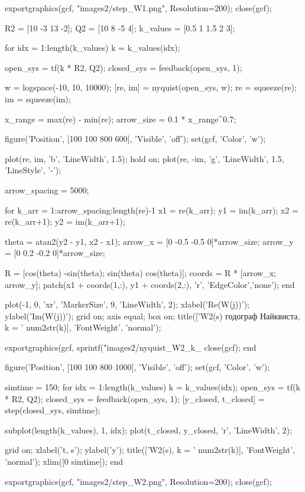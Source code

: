\begin{matlabcode}
exportgraphics(gcf, "images2/step_W1.png", Resolution=200);
close(gcf);

R2 = [10 -3 13 -2];
Q2 = [10 8 -5 4];
k_values = [0.5 1 1.5 2 3];

for idx = 1:length(k_values)
    k = k_values(idx);
    
    open_sys = tf(k * R2, Q2);
    closed_sys = feedback(open_sys, 1);
    
    w = logspace(-10, 10, 10000);
    [re, im] = nyquist(open_sys, w);
    re = squeeze(re);
    im = squeeze(im);
    
    x_range = max(re) - min(re);
    arrow_size = 0.1 * x_range^0.7;
    
    figure('Position', [100 100 800 600], 'Visible', 'off');
    set(gcf, 'Color', 'w');
    
    plot(re, im, 'b', 'LineWidth', 1.5);
    hold on;
    plot(re, -im, 'g', 'LineWidth', 1.5, 'LineStyle', '-');
    
    arrow_spacing = 5000;
    
    for k_arr = 1:arrow_spacing:length(re)-1
        x1 = re(k_arr);
        y1 = im(k_arr);
        x2 = re(k_arr+1);
        y2 = im(k_arr+1);
        
        theta = atan2(y2 - y1, x2 - x1);
        arrow_x = [0 -0.5 -0.5 0]*arrow_size;
        arrow_y = [0 0.2 -0.2 0]*arrow_size;
        
        R = [cos(theta) -sin(theta); sin(theta) cos(theta)];
        coords = R * [arrow_x; arrow_y];
        patch(x1 + coords(1,:), y1 + coords(2,:), 'r', 'EdgeColor','none');
    end
    
    plot(-1, 0, 'xr', 'MarkerSize', 9, 'LineWidth', 2);
    xlabel('Re(W(j\omega))');
    ylabel('Im(W(j\omega))');
    grid on;
    axis equal;
    box on;
    title(['W2(s) годограф Найквиста, k = ' num2str(k)], 'FontWeight', 'normal');
    
    exportgraphics(gcf, sprintf("images2/nyquist_W2_k_%
    close(gcf);
end

figure('Position', [100 100 800 1000], 'Visible', 'off');
set(gcf, 'Color', 'w');

simtime = 150;
for idx = 1:length(k_values)
    k = k_values(idx);
    open_sys = tf(k * R2, Q2);
    closed_sys = feedback(open_sys, 1);
    [y_closed, t_closed] = step(closed_sys, simtime);
    
    subplot(length(k_values), 1, idx);
    plot(t_closed, y_closed, 'r', 'LineWidth', 2);
    
    grid on;
    xlabel('t, s');
    ylabel('y');
    title(['W2(s), k = ' num2str(k)], 'FontWeight', 'normal');
    xlim([0 simtime]);
end

exportgraphics(gcf, "images2/step_W2.png", Resolution=200);
close(gcf);

\end{matlabcode}

